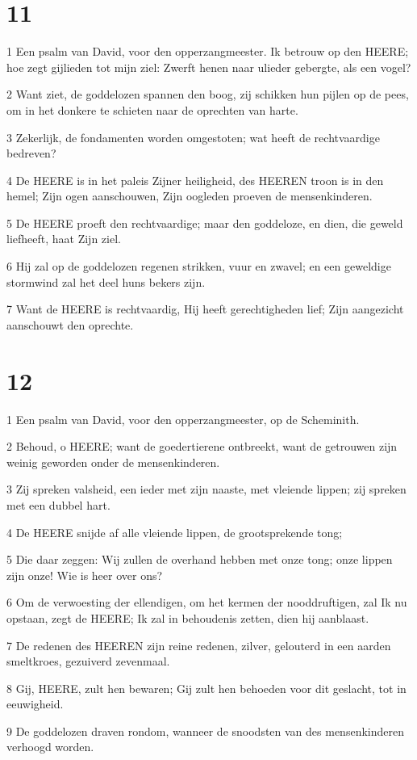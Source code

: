 \chapter{11}

\par 1 Een psalm van David, voor den opperzangmeester. Ik betrouw op den HEERE; hoe zegt gijlieden tot mijn ziel: Zwerft henen naar ulieder gebergte, als een vogel?
\par 2 Want ziet, de goddelozen spannen den boog, zij schikken hun pijlen op de pees, om in het donkere te schieten naar de oprechten van harte.
\par 3 Zekerlijk, de fondamenten worden omgestoten; wat heeft de rechtvaardige bedreven?
\par 4 De HEERE is in het paleis Zijner heiligheid, des HEEREN troon is in den hemel; Zijn ogen aanschouwen, Zijn oogleden proeven de mensenkinderen.
\par 5 De HEERE proeft den rechtvaardige; maar den goddeloze, en dien, die geweld liefheeft, haat Zijn ziel.
\par 6 Hij zal op de goddelozen regenen strikken, vuur en zwavel; en een geweldige stormwind zal het deel huns bekers zijn.
\par 7 Want de HEERE is rechtvaardig, Hij heeft gerechtigheden lief; Zijn aangezicht aanschouwt den oprechte.

\chapter{12}

\par 1 Een psalm van David, voor den opperzangmeester, op de Scheminith.
\par 2 Behoud, o HEERE; want de goedertierene ontbreekt, want de getrouwen zijn weinig geworden onder de mensenkinderen.
\par 3 Zij spreken valsheid, een ieder met zijn naaste, met vleiende lippen; zij spreken met een dubbel hart.
\par 4 De HEERE snijde af alle vleiende lippen, de grootsprekende tong;
\par 5 Die daar zeggen: Wij zullen de overhand hebben met onze tong; onze lippen zijn onze! Wie is heer over ons?
\par 6 Om de verwoesting der ellendigen, om het kermen der nooddruftigen, zal Ik nu opstaan, zegt de HEERE; Ik zal in behoudenis zetten, dien hij aanblaast.
\par 7 De redenen des HEEREN zijn reine redenen, zilver, gelouterd in een aarden smeltkroes, gezuiverd zevenmaal.
\par 8 Gij, HEERE, zult hen bewaren; Gij zult hen behoeden voor dit geslacht, tot in eeuwigheid.
\par 9 De goddelozen draven rondom, wanneer de snoodsten van des mensenkinderen verhoogd worden.

